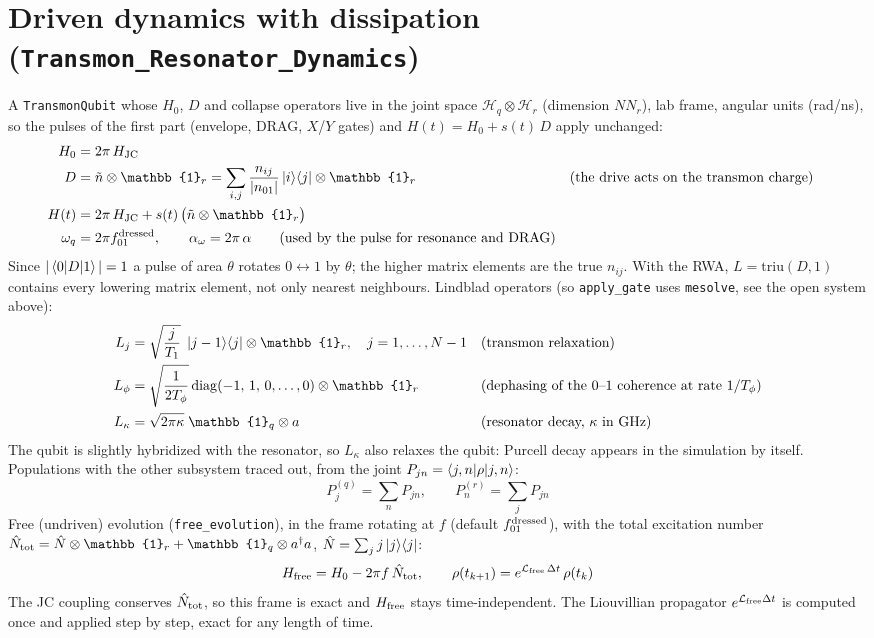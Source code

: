 \documentclass[11pt]{article}
\newcommand{\ad}{a^{\dagger}}
\newcommand{\id}{\mathbb{1}}
\newcommand{\nq}{\tilde n}
\begin{document}
\section*{Driven dynamics with dissipation (\texttt{Transmon\_Resonator\_Dynamics})}
A \texttt{TransmonQubit} whose $H_0$, $D$ and collapse operators live in the joint space
$\mathcal{H}_q\otimes\mathcal{H}_r$ (dimension $N N_r$), lab frame, angular units (rad/ns), so
the pulses of the first part (envelope, DRAG, $X$/$Y$ gates) and $H(t) = H_0 + s(t)\,D$ apply
unchanged:
\begin{align}
  H_0 &= 2\pi\,H_{\rm JC} \\
  D &= \nq \otimes \id_r = \sum_{i,j}\frac{n_{ij}}{|n_{01}|}\ket{i}\!\bra{j}\otimes\id_r
  && \text{(the drive acts on the transmon charge)} \\
  H(t) &= 2\pi\,H_{\rm JC} + s(t)\,\big(\nq\otimes\id_r\big) \\
  \omega_q &= 2\pi f_{01}^{\rm dressed}, \qquad \alpha_\omega = 2\pi\,\alpha
  \qquad \text{(used by the pulse for resonance and DRAG)}
\end{align}
Since $|\braket{0|D|1}| = 1$ a pulse of area $\theta$ rotates $0\leftrightarrow1$ by $\theta$; the
higher matrix elements are the true $n_{ij}$. With the RWA, $L = \mathrm{triu}(D,1)$ contains
every lowering matrix element, not only nearest neighbours.
Lindblad operators (so \texttt{apply\_gate} uses \texttt{mesolve}, see the open system above):
\begin{align}
  L_j &= \sqrt{\frac{j}{T_1}}\;\ket{j-1}\!\bra{j}\otimes\id_r, \quad j = 1,\dots,N-1
  && \text{(transmon relaxation)} \\
  L_\phi &= \sqrt{\frac{1}{2T_\phi}}\,\mathrm{diag}(-1,\,1,\,0,\dots,0)\otimes\id_r
  && \text{(dephasing of the 0--1 coherence at rate } 1/T_\phi) \\
  L_\kappa &= \sqrt{2\pi\kappa}\;\id_q\otimes a
  && \text{(resonator decay, } \kappa \text{ in GHz)}
\end{align}
The qubit is slightly hybridized with the resonator, so $L_\kappa$ also relaxes the qubit:
Purcell decay appears in the simulation by itself. Populations with the other subsystem traced
out, from the joint $P_{jn} = \braket{j,n|\rho|j,n}$:
\begin{equation}
  P_j^{(q)} = \sum_{n} P_{jn}, \qquad P_n^{(r)} = \sum_{j} P_{jn}
\end{equation}
Free (undriven) evolution (\texttt{free\_evolution}), in the frame rotating at $f$ (default
$f_{01}^{\rm dressed}$), with the total excitation number
$\hat N_{\rm tot} = \hat N\otimes\id_r + \id_q\otimes\ad a$, $\hat N = \sum_j j\ket{j}\!\bra{j}$:
\begin{equation}
  H_{\rm free} = H_0 - 2\pi f\,\hat N_{\rm tot}, \qquad
  \rho(t_{k+1}) = e^{\mathcal{L}_{\rm free}\,\Delta t}\,\rho(t_k)
\end{equation}
The JC coupling conserves $\hat N_{\rm tot}$, so this frame is exact and $H_{\rm free}$ stays
time-independent. The Liouvillian propagator $e^{\mathcal{L}_{\rm free}\Delta t}$ is computed once
and applied step by step, exact for any length of time.
\end{document}
